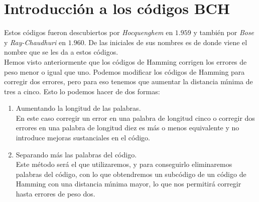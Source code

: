 %
%

\chapter{Introducci\'on a los c\'odigos BCH}

Estos c\'odigos fueron descubiertos por \emph{Hocquenghem} en $1.959$ y
tambi\'en por \emph{Bose} y \emph{Ray-Chaudhuri} en $1.960$. De las
iniciales de sus nombres es de donde viene el nombre que se les da a estos
c\'odigos.\\

Hemos visto anteriormente que los c\'odigos de Hamming corrigen los errores de
peso menor o igual que uno. Podemos modificar los c\'odigos de Hamming para
corregir dos errores, pero para eso tenemos que aumentar la distancia
m\'{\i}nima de tres a cinco. Esto lo podemos hacer de dos formas:
\begin{enumerate}
\item Aumentando la longitud de las palabras.\\

En este caso corregir un error en una palabra de longitud cinco o corregir dos
errores en una palabra de longitud diez es m\'as o menos equivalente y no
introduce mejoras sustanciales en el c\'odigo.
\item Separando m\'as las palabras del c\'odigo.\\

Este m\'etodo ser\'a el que utilizaremos, y para conseguirlo eliminaremos 
palabras del c\'odigo, con lo que obtendremos un subc\'odigo de un c\'odigo
de Hamming con una distancia m\'{\i}nima mayor, lo que nos permitir\'a
corregir hasta errores de peso dos.
\end{enumerate}

%
%



%
%



%
%



%
%



%
%



%
%


